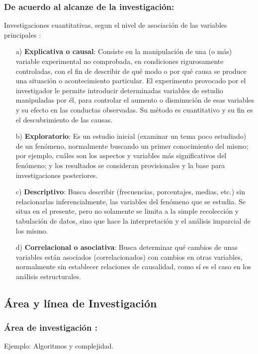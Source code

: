 \documentclass[a4paper, 12pt]{article}
\begin{document}
\subsubsection{De acuerdo al alcanze de  la investigación:}
Investigaciones cuantitativas, segun el nivel de asociación de las variables principales \cite{Erica}:
\begin{enumerate} 
\item [a)] {\bf Explicativa o causal}: Consiste en la manipulación de una (o más) variable experimental no comprobada, en condiciones rigurosamente controladas, con el fin de describir de qué modo o por qué causa se produce una situación o acontecimiento particular. El experimento provocado por el investigador le permite introducir determinadas variables de estudio manipuladas por él, para controlar el aumento o disminución de esas variables y su efecto en las conductas observadas. Su método es cuantitativo y su fin es el descubrimiento de las causas.  
\vskip 0.3cm
\item[b)] {\bf Exploratorio}: Es un estudio inicial (examinar un tema poco estudiado) de un fenómeno, normalmente buscando un primer conocimiento del mismo; por ejemplo, cuáles son los aspectos y variables más significativos del fenómeno; y los resultados se consideran provisionales y la base para investigaciones posteriores.
\vskip 0.3cm
\item[c)]{\bf Descriptivo}: Busca describir (frecuencias, porcentajes, medias, etc.) sin relacionarlas inferencialmente, las variables del fenómeno que se estudia. Se situa en el presente, pero no solamente se limita a la simple recolección y tabulación de datos, sino que hace la interpretación y el análisis imparcial de los mismo.  
\vskip 0.3cm
\item[d)] {\bf Correlacional o asociativa}: Busca determinar qué cambios de unas variables están asociados (correlacionados) con cambios en otras variables, normalmente sin establecer relaciones de causalidad, como sí es el caso en los análisis estructurales.
\end{enumerate}


\subsection{Área y línea de Investigación}
\subsubsection{Área de investigación :} 
Ejemplo: Algoritmos y complejidad.
 
\end{document}
